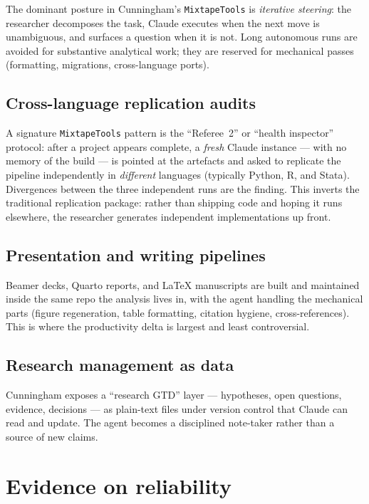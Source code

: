 \documentclass[11pt,a4paper]{article}
\begin{document}
The dominant posture in Cunningham's \texttt{MixtapeTools} is
\emph{iterative steering}: the researcher decomposes the task,
Claude executes when the next move is unambiguous, and surfaces a
question when it is not. Long autonomous runs are avoided for
substantive analytical work; they are reserved for mechanical passes
(formatting, migrations, cross-language ports).

\subsection{Cross-language replication audits}

A signature \texttt{MixtapeTools} pattern is the ``Referee~2'' or
``health inspector'' protocol: after a project appears complete, a
\emph{fresh} Claude instance --- with no memory of the build --- is
pointed at the artefacts and asked to replicate the pipeline
independently in \emph{different} languages (typically Python, R, and
Stata). Divergences between the three independent runs are the
finding. This inverts the traditional replication package: rather
than shipping code and hoping it runs elsewhere, the researcher
generates independent implementations up front.

\subsection{Presentation and writing pipelines}

Beamer decks, Quarto reports, and \LaTeX{} manuscripts are built and
maintained inside the same repo the analysis lives in, with the
agent handling the mechanical parts (figure regeneration, table
formatting, citation hygiene, cross-references). This is where the
productivity delta is largest and least controversial.

\subsection{Research management as data}

Cunningham exposes a ``research GTD'' layer --- hypotheses, open
questions, evidence, decisions --- as plain-text files under version
control that Claude can read and update. The agent becomes a
disciplined note-taker rather than a source of new claims.

\section{Evidence on reliability}
\end{document}
